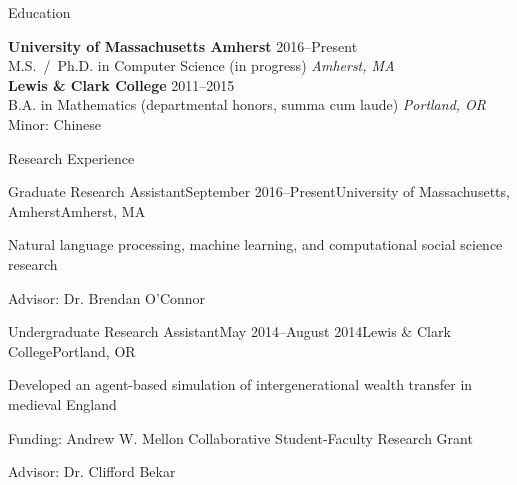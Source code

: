 \documentclass{resume} %
\begin{document}
%


\begin{rSection}{Education}

{\bf University of Massachusetts Amherst} \hfill {2016--Present} \\ 
M.S.~/~Ph.D. in Computer Science (in progress) \hfill {\em Amherst, MA} \\

{\bf Lewis \& Clark College} \hfill {2011--2015} \\ 
B.A. in Mathematics (departmental honors, summa cum laude) \hfill {\em Portland, OR} \\
Minor: Chinese \\

\end{rSection}


\begin{rSection}{Research Experience}

\begin{rSubsection}{Graduate Research Assistant}{September 2016--Present}{University of Massachusetts, Amherst}{Amherst, MA}
\item Natural language processing, machine learning, and computational social science research
\item Advisor: Dr. Brendan O'Connor 
\end{rSubsection}


\begin{rSubsection}{Undergraduate Research Assistant}{May 2014--August 2014}{Lewis \& Clark College}{Portland, OR}
\item Developed an agent-based simulation of intergenerational wealth transfer in medieval England
\item Funding: Andrew W. Mellon Collaborative Student-Faculty Research Grant
\item Advisor: Dr. Clifford Bekar
\end{rSubsection}

\end{rSection}
\end{document}
